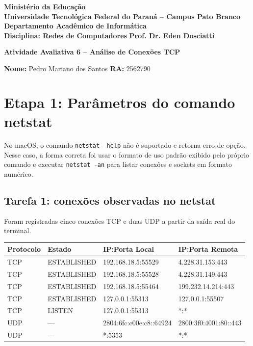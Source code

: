 \documentclass[12pt,a4paper]{article}
\begin{document}
\begin{center}
\textbf{Ministério da Educação}\\
\textbf{Universidade Tecnológica Federal do Paraná -- Campus Pato Branco}\\
\textbf{Departamento Acadêmico de Informática}\\[0.5em]
\textbf{Disciplina: Redes de Computadores} \hfill \textbf{Prof. Dr. Eden Dosciatti}

\vspace{1.2em}
\Large\textbf{Atividade Avaliativa 6 -- Análise de Conexões TCP}
\end{center}

\vspace{1em}
\noindent\textbf{Nome:} Pedro Mariano dos Santos \hfill \textbf{RA:} 2562790

\vspace{1em}

\section*{Etapa 1: Parâmetros do comando netstat}

No macOS, o comando \texttt{netstat --help} não é suportado e retorna erro de opção. Nesse caso, a forma correta foi usar o formato de uso padrão exibido pelo próprio comando e executar \texttt{netstat -an} para listar conexões e sockets em formato numérico.

\subsection*{Tarefa 1: conexões observadas no netstat}

Foram registradas cinco conexões TCP e duas UDP a partir da saída real do terminal.

\begin{center}
\renewcommand{\arraystretch}{1.2}
\begin{tabular}{|p{2.2cm}|p{2.5cm}|p{4.3cm}|p{4.3cm}|}
\hline
\textbf{Protocolo} & \textbf{Estado} & \textbf{IP:Porta Local} & \textbf{IP:Porta Remota} \\
\hline
TCP & ESTABLISHED & 192.168.18.5:55529 & 4.228.31.153:443 \\
\hline
TCP & ESTABLISHED & 192.168.18.5:55528 & 4.228.31.149:443 \\
\hline
TCP & ESTABLISHED & 192.168.18.5:55464 & 199.232.14.214:443 \\
\hline
TCP & ESTABLISHED & 127.0.0.1:55313 & 127.0.0.1:55507 \\
\hline
TCP & LISTEN & 127.0.0.1:55313 & *:* \\
\hline
UDP & --- & 2804:6fc:c00e:c8::64924 & 2800:3f0:4001:80::443 \\
\hline
UDP & --- & *:5353 & *:* \\
\hline
\end{tabular}
\end{center}
\end{document}
